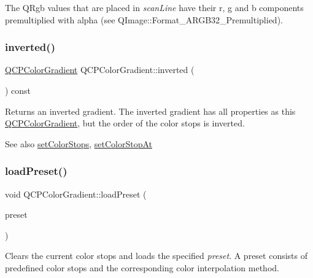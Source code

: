 The Q\+Rgb values that are placed in {\itshape scan\+Line} have their r, g and b components premultiplied with alpha (see Q\+Image\+::\+Format\+\_\+\+A\+R\+G\+B32\+\_\+\+Premultiplied). \mbox{\label{class_q_c_p_color_gradient_a9f72f501de429829ec446333316decda}} 
\subsubsection{\texorpdfstring{inverted()}{inverted()}}
{\footnotesize\ttfamily \hyperlink{class_q_c_p_color_gradient}{Q\+C\+P\+Color\+Gradient} Q\+C\+P\+Color\+Gradient\+::inverted (\begin{DoxyParamCaption}{ }\end{DoxyParamCaption}) const}

Returns an inverted gradient. The inverted gradient has all properties as this \hyperlink{class_q_c_p_color_gradient}{Q\+C\+P\+Color\+Gradient}, but the order of the color stops is inverted.

\begin{DoxySeeAlso}{See also}
\hyperlink{class_q_c_p_color_gradient_a724e828aa6f0ba5011a9392477c35d3a}{set\+Color\+Stops}, \hyperlink{class_q_c_p_color_gradient_a3b48be5e78079db1bb2a1188a4c3390e}{set\+Color\+Stop\+At} 
\end{DoxySeeAlso}
\mbox{\label{class_q_c_p_color_gradient_aa0aeec1528241728b9671bf8e60b1622}} 
\subsubsection{\texorpdfstring{load\+Preset()}{loadPreset()}}
{\footnotesize\ttfamily void Q\+C\+P\+Color\+Gradient\+::load\+Preset (\begin{DoxyParamCaption}\item[{\hyperlink{class_q_c_p_color_gradient_aed6569828fee337023670272910c9072}{Gradient\+Preset}}]{preset }\end{DoxyParamCaption})}

Clears the current color stops and loads the specified {\itshape preset}. A preset consists of predefined color stops and the corresponding color interpolation method.

